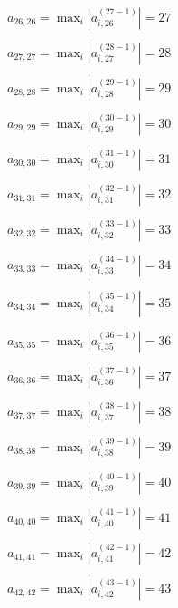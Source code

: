 \documentclass[a4paper,12pt]{article}
\begin{document}
$a _{ 26, 26 } =  \max _i |a _{ i, 26 } ^{ (27 - 1) } | = 27$

$a _{ 27, 27 } =  \max _i |a _{ i, 27 } ^{ (28 - 1) } | = 28$

$a _{ 28, 28 } =  \max _i |a _{ i, 28 } ^{ (29 - 1) } | = 29$

$a _{ 29, 29 } =  \max _i |a _{ i, 29 } ^{ (30 - 1) } | = 30$

$a _{ 30, 30 } =  \max _i |a _{ i, 30 } ^{ (31 - 1) } | = 31$

$a _{ 31, 31 } =  \max _i |a _{ i, 31 } ^{ (32 - 1) } | = 32$

$a _{ 32, 32 } =  \max _i |a _{ i, 32 } ^{ (33 - 1) } | = 33$

$a _{ 33, 33 } =  \max _i |a _{ i, 33 } ^{ (34 - 1) } | = 34$

$a _{ 34, 34 } =  \max _i |a _{ i, 34 } ^{ (35 - 1) } | = 35$

$a _{ 35, 35 } =  \max _i |a _{ i, 35 } ^{ (36 - 1) } | = 36$

$a _{ 36, 36 } =  \max _i |a _{ i, 36 } ^{ (37 - 1) } | = 37$

$a _{ 37, 37 } =  \max _i |a _{ i, 37 } ^{ (38 - 1) } | = 38$

$a _{ 38, 38 } =  \max _i |a _{ i, 38 } ^{ (39 - 1) } | = 39$

$a _{ 39, 39 } =  \max _i |a _{ i, 39 } ^{ (40 - 1) } | = 40$

$a _{ 40, 40 } =  \max _i |a _{ i, 40 } ^{ (41 - 1) } | = 41$

$a _{ 41, 41 } =  \max _i |a _{ i, 41 } ^{ (42 - 1) } | = 42$

$a _{ 42, 42 } =  \max _i |a _{ i, 42 } ^{ (43 - 1) } | = 43$
\end{document}
